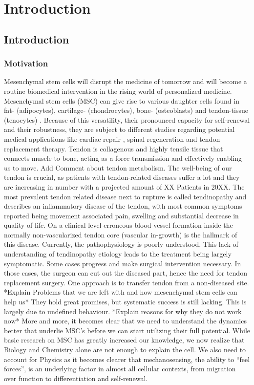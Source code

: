 \chapter{Introduction}

\section{Introduction}
\subsection{Motivation}
\label{sec:motivation}
Mesenchymal stem cells will disrupt the medicine of tomorrow and will become a routine biomedical intervention in the rising world of personalized medicine. 
Mesenchymal stem cells (MSC) can give rise to various daughter cells found in fat- (adipocytes), cartilage- (chondrocytes), bone- (osteoblasts) and tendon-tissue (tenocytes) \cite{Barlow2008, Hass2011}. Because of this versatility, their pronounced capacity for self-renewal and their robustness, they are subject to different studies regarding potential medical applications like cardiac repair \cite{Pittenger2004}, spinal regeneration \cite{Goldschlager2010} and tendon replacement therapy.  
Tendon is collagenous and highly tensile tissue that connects muscle to bone, acting as a force transmission and effectively enabling us to move. Add Comment about tendon metabolism. The well-being of our tendon is crucial, as patients with tendon-related diseases suffer a lot and they are increasing in number with a projected amount of XX Patients in 20XX. The most prevalent tendon related disease next to rupture is called tendinopathy and describes an inflammatory disease of the tendon, with most common symptoms reported being movement associated pain, swelling and substantial decrease in quality of life. On a clinical level erroneous blood vessel formation inside the normally non-vascularized tendon core (vascular in-growth) is the hallmark of this disease. Currently, the pathophysiology is poorly understood. This lack of understanding of tendinopathy etiology leads to the treatment being largely symptomatic.  Some cases progress and make surgical intervention necessary. In those cases, the surgeon can cut out the diseased part, hence the need for tendon replacement surgery.  One approach is to transfer tendon from a non-diseased site. *Explain Problems that we are left with and how mesenchymal stem cells can help us* They hold great promises, but systematic success is still lacking. This is largely due to undefined behaviour. *Explain reasons for why they do not work now* More and more, it becomes clear that we need to understand the dynamics better that underlie MSC’s before we can start utilizing their full potential. While basic research on MSC has greatly increased our knowledge, we now realize that Biology and Chemistry alone are not enough to explain the cell. We also need to account for Physics as it becomes clearer that mechanosensing, the ability to “feel forces”, is an underlying factor in almost all cellular contexts, from migration over function to differentiation and self-renewal.  
